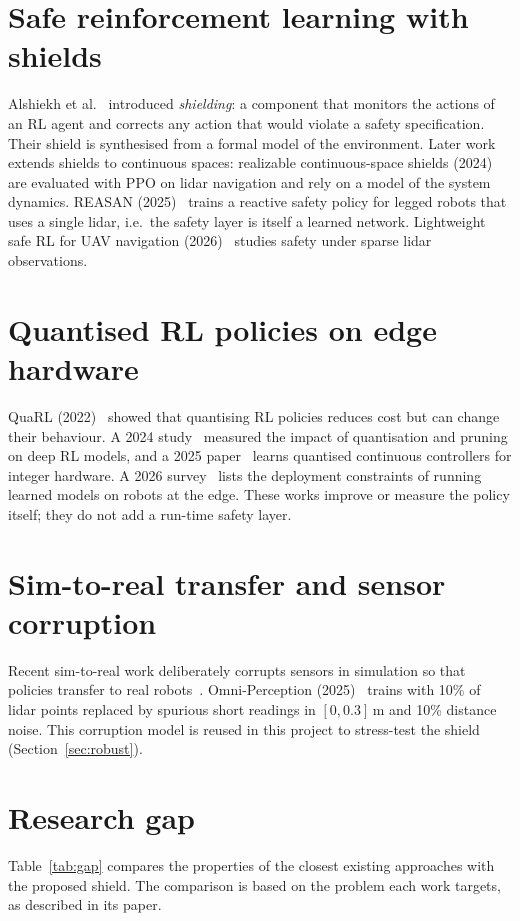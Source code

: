 \documentclass[12pt,a4paper,oneside]{report}
\begin{document}
\section{Safe reinforcement learning with shields}
Alshiekh et al.~\cite{alshiekh} introduced \emph{shielding}: a component that monitors the actions of an RL agent and
corrects any action that would violate a safety specification. Their shield is synthesised from a formal model of
the environment. Later work extends shields to continuous spaces: realizable continuous-space shields
(2024)~\cite{realizable2024} are evaluated with PPO on lidar navigation and rely on a model of the system dynamics.
REASAN (2025)~\cite{reasan2025} trains a reactive safety policy for legged robots that uses a single lidar, i.e.\ the
safety layer is itself a learned network. Lightweight safe RL for UAV navigation (2026)~\cite{uavsafe2026} studies
safety under sparse lidar observations.

\section{Quantised RL policies on edge hardware}
QuaRL (2022)~\cite{quarl} showed that quantising RL policies reduces cost but can change their behaviour. A 2024
study~\cite{quantprune2024} measured the impact of quantisation and pruning on deep RL models, and a 2025
paper~\cite{quantctrl2025} learns quantised continuous controllers for integer hardware. A 2026
survey~\cite{edgesurvey2026} lists the deployment constraints of running learned models on robots at the edge.
These works improve or measure the policy itself; they do not add a run-time safety layer.

\section{Sim-to-real transfer and sensor corruption}
Recent sim-to-real work deliberately corrupts sensors in simulation so that policies transfer to real
robots~\cite{sim2real2025,sim2realsurvey2025,navrlpp2026}. Omni-Perception (2025)~\cite{omni2025} trains with 10\% of
lidar points replaced by spurious short readings in $[0,0.3]$\,m and 10\% distance noise. This corruption model is
reused in this project to stress-test the shield (Section~\ref{sec:robust}).

\section{Research gap}
Table~\ref{tab:gap} compares the properties of the closest existing approaches with the proposed shield. The
comparison is based on the problem each work targets, as described in its paper.
\end{document}
